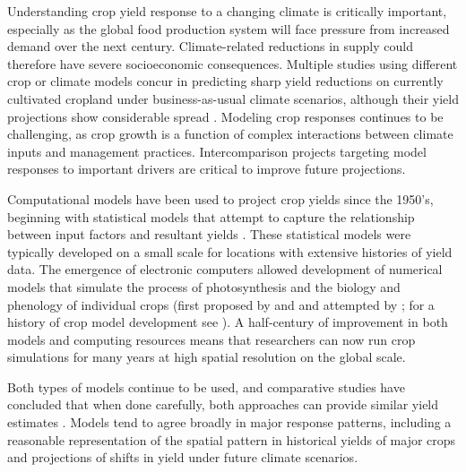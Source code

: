 \documentclass[esd, manuscript]{copernicus} %
\begin{document}

\introduction
\label{S:1}
Understanding crop yield response to a changing climate is critically important, especially as the global food production system will face pressure from increased demand over the next century. Climate-related reductions in supply could therefore have severe socioeconomic consequences. Multiple studies using different crop or climate models concur in predicting sharp yield reductions on currently cultivated cropland under {business-as-usual} climate scenarios, although their yield projections show considerable spread \citep[e.g.][and references therein]{Rosenzweig2014, Schauberger2017, porter2014}. Modeling crop responses continues to be challenging, as crop growth is a function of complex interactions between climate inputs and management practices. Intercomparison projects targeting model responses to important drivers are critical to improve future projections.

Computational models have been used to project crop yields since the 1950's, beginning with statistical models  that attempt to capture the relationship between input factors and resultant yields \citep[e.g.][]{Heady57, Heady61}. These statistical models were typically developed on a small scale for locations with extensive histories of yield data. The emergence of electronic computers allowed development of numerical models that simulate the process of photosynthesis and the biology and phenology of individual crops (first proposed by \citet{wit58} and \citet{Duncan67} and attempted by \citet{Duncan72}; for a history of crop model development see \citet{Rosenzweig2014}). A half-century of improvement in both models and computing resources means that researchers can now run crop simulations for many years at high spatial resolution on the global scale. 

Both types of models continue to be used, and comparative studies have concluded that when done carefully, both approaches can provide similar yield estimates \citep[e.g.][]{Lobell2010, Moore2017, Roberts2017, zhao2017}. Models tend to agree broadly in major response patterns, including a reasonable representation of the spatial pattern in historical yields of major crops \citep[e.g.][]{Elliott2015, muller_global_2017} and projections of shifts in yield under future climate scenarios.
\end{document}

